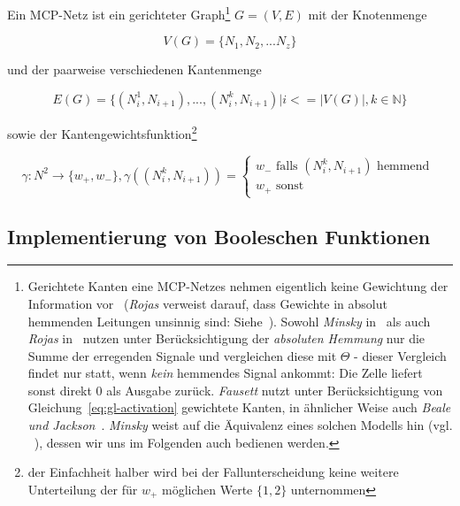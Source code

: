 \begin{definition} Ein MCP-Netz ist ein gerichteter Graph\footnote{
    Gerichtete Kanten eine MCP-Netzes nehmen eigentlich keine Gewichtung der Information vor~\cite[40]{Roj93} (\textit{Rojas} verweist darauf, dass Gewichte in absolut hemmenden Leitungen unsinnig sind: Siehe~\cite[42]{Roj93}). Sowohl \textit{Minsky} in~\cite[34]{Min67} als auch \textit{Rojas} in~\cite[32]{Roj93} nutzen unter Berücksichtigung der \textit{absoluten Hemmung} nur die Summe der erregenden Signale und vergleichen diese mit $\Theta$ - dieser Vergleich findet nur statt, wenn \textit{kein} hemmendes Signal ankommt: Die Zelle liefert sonst direkt $0$ als Ausgabe zurück. \textit{Fausett} nutzt unter Berücksichtigung von Gleichung~\ref{eq:gl-activation} gewichtete Kanten, in ähnlicher Weise auch \textit{Beale und Jackson}~\cite[41]{BJ90}. \textit{Minsky} weist auf die Äquivalenz eines solchen Modells hin (vgl. ~\cite[34 f.]{Min67}), dessen wir uns im Folgenden auch bedienen werden.
} $G = (V, E)$ mit der Knotenmenge

\begin{equation}
V(G) =\{N_1, N_2, ... N_z\}
\end{equation}

und der paarweise verschiedenen Kantenmenge

\begin{equation}
E(G) = \{ (N^1_i, N_{i+1}), ..., (N^k_i, N_{i+1}) | i <= |V(G)|, k \in \mathbb{N} \}
\end{equation}

sowie der Kantengewichtsfunktion\footnote{
der Einfachheit halber wird bei der Fallunterscheidung keine weitere Unterteilung der für $w_+$ möglichen Werte $\{1, 2\}$ unternommen
}

\begin{equation}
\gamma: N^2 \to \{w_+, w_-\}, \gamma((N^k_i, N_{i+1})) = \begin{cases}
                                                              w_- \text{ falls } (N^k_i, N_{i+1})  \text{ hemmend } \\
                                                              w_+  \text{ sonst}
\end{cases}
\end{equation}
\label{def:mcpnetz}
\end{definition}



\subsection{Implementierung von Booleschen Funktionen}\label{seq-mcpbool}

